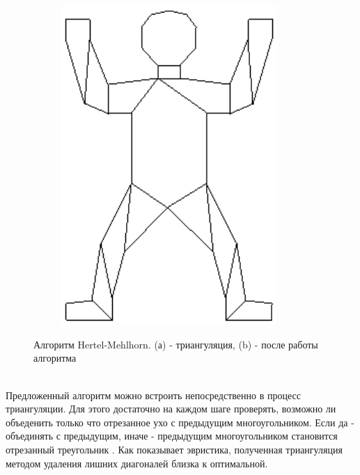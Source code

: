 \documentclass[11pt,a4paper]{extarticle}
\begin{document}
\begin{figure}[ht]
\begin{subfigure}[ht]{1in}
					\includegraphics[width=0.9\textwidth]{hm2}
					\caption{}
				\end{subfigure}
				\caption{Алгоритм Hertel-Mehlhorn. (а) - триангуляция, (b) - после работы алгоритма}				
				\label{hmalg}
			\end{figure}\\
			Предложенный алгоритм можно встроить непосредственно в процесс триангуляции.
			Для этого достаточно на каждом шаге проверять, возможно ли объеденить только что отрезанное ухо с предыдущим многоугольником.
			Если да - объединять с предыдущим, иначе - предыдущим многоугольником становится отрезанный треугольник \cite{RTCD}.
			Как показывает эвристика, полученная триангуляция методом удаления лишних диагоналей близка к оптимальной.
			
\end{document}
